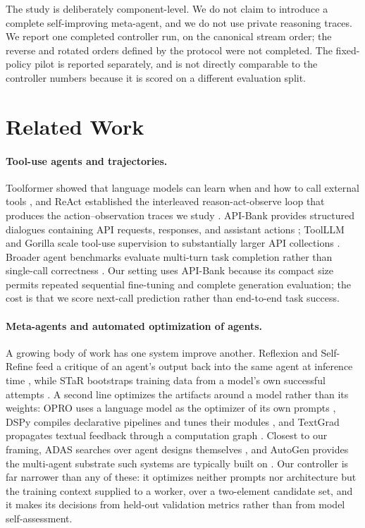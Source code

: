 \documentclass{article}
\begin{document}
The study is deliberately component-level. We do not claim to introduce a complete self-improving meta-agent, and we do not use private reasoning traces. We report one completed controller run, on the canonical stream order; the reverse and rotated orders defined by the protocol were not completed. The fixed-policy pilot is reported separately, and is not directly comparable to the controller numbers because it is scored on a different evaluation split.

\section{Related Work}

\paragraph{Tool-use agents and trajectories.}
Toolformer showed that language models can learn when and how to call external tools \citep{schick2023toolformer}, and ReAct established the interleaved reason-act-observe loop that produces the action--observation traces we study \citep{yao2023react}. API-Bank provides structured dialogues containing API requests, responses, and assistant actions \citep{li2023apibank}; ToolLLM and Gorilla scale tool-use supervision to substantially larger API collections \citep{qin2023toolllm,patil2023gorilla}. Broader agent benchmarks evaluate multi-turn task completion rather than single-call correctness \citep{liu2023agentbench,yao2024taubench}. Our setting uses API-Bank because its compact size permits repeated sequential fine-tuning and complete generation evaluation; the cost is that we score next-call prediction rather than end-to-end task success.

\paragraph{Meta-agents and automated optimization of agents.}
A growing body of work has one system improve another. Reflexion and Self-Refine feed a critique of an agent's output back into the same agent at inference time \citep{shinn2023reflexion,madaan2023selfrefine}, while STaR bootstraps training data from a model's own successful attempts \citep{zelikman2022star}. A second line optimizes the artifacts around a model rather than its weights: OPRO uses a language model as the optimizer of its own prompts \citep{yang2023opro}, DSPy compiles declarative pipelines and tunes their modules \citep{khattab2023dspy}, and TextGrad propagates textual feedback through a computation graph \citep{yuksekgonul2024textgrad}. Closest to our framing, ADAS searches over agent designs themselves \citep{hu2024adas}, and AutoGen provides the multi-agent substrate such systems are typically built on \citep{wu2023autogen}. Our controller is far narrower than any of these: it optimizes neither prompts nor architecture but the training context supplied to a worker, over a two-element candidate set, and it makes its decisions from held-out validation metrics rather than from model self-assessment.
\end{document}
